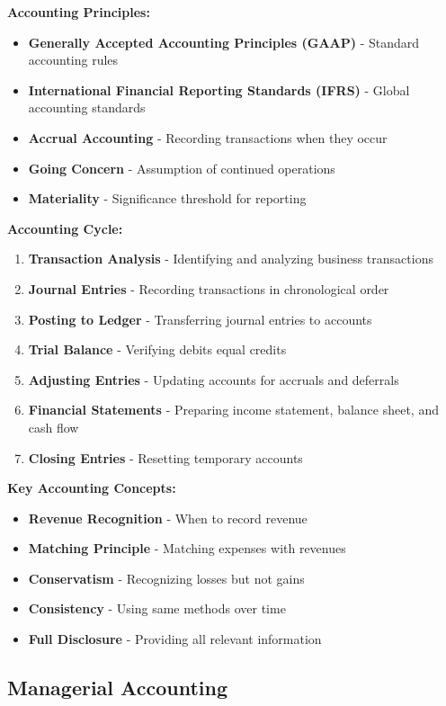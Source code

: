 \documentclass[12pt]{article}
\begin{document}
\textbf{Accounting Principles:}
\begin{itemize}
    \item \textbf{Generally Accepted Accounting Principles (GAAP)} - Standard accounting rules
    \item \textbf{International Financial Reporting Standards (IFRS)} - Global accounting standards
    \item \textbf{Accrual Accounting} - Recording transactions when they occur
    \item \textbf{Going Concern} - Assumption of continued operations
    \item \textbf{Materiality} - Significance threshold for reporting
\end{itemize}

\textbf{Accounting Cycle:}
\begin{enumerate}
    \item \textbf{Transaction Analysis} - Identifying and analyzing business transactions
    \item \textbf{Journal Entries} - Recording transactions in chronological order
    \item \textbf{Posting to Ledger} - Transferring journal entries to accounts
    \item \textbf{Trial Balance} - Verifying debits equal credits
    \item \textbf{Adjusting Entries} - Updating accounts for accruals and deferrals
    \item \textbf{Financial Statements} - Preparing income statement, balance sheet, and cash flow
    \item \textbf{Closing Entries} - Resetting temporary accounts
\end{enumerate}

\textbf{Key Accounting Concepts:}
\begin{itemize}
    \item \textbf{Revenue Recognition} - When to record revenue
    \item \textbf{Matching Principle} - Matching expenses with revenues
    \item \textbf{Conservatism} - Recognizing losses but not gains
    \item \textbf{Consistency} - Using same methods over time
    \item \textbf{Full Disclosure} - Providing all relevant information
\end{itemize}

\subsection{Managerial Accounting}
\end{document}
